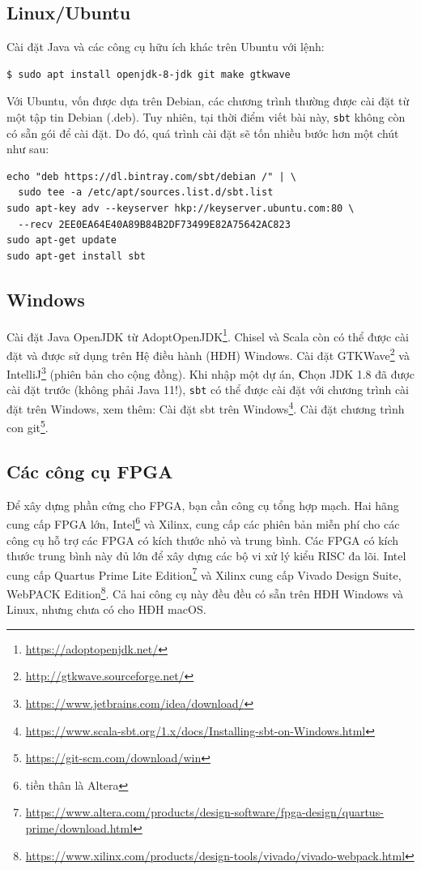 \documentclass[%
    10pt,
    headinclude, footexclude,
    openright, %
    notitlepage,
    cleardoubleempty,
    headsepline,
    pointlessnumbers,
    bibtotoc, idxtotoc,
    ]{scrbook}
\newcommand{\code}[1]{{\small{\texttt{#1}}}}
\newcommand{\myref}[2]{\href{#1}{#2}}
\renewcommand{\myref}[2]{{#2}{\footnote{\url{#1}}}}
\begin{document}
\subsection{Linux/Ubuntu}

Cài đặt Java và các công cụ hữu ích khác trên Ubuntu với lệnh:
\begin{verbatim}
$ sudo apt install openjdk-8-jdk git make gtkwave
\end{verbatim}

Với Ubuntu, vốn được dựa trên Debian, các chương trình thường được cài đặt từ một tập tin Debian (.deb). Tuy nhiên, tại thời điểm viết bài này, \code{sbt} không còn có sẵn gói để cài đặt. Do đó, quá trình cài đặt sẽ tốn nhiều bước hơn một chút như sau:
\begin{verbatim}
echo "deb https://dl.bintray.com/sbt/debian /" | \
  sudo tee -a /etc/apt/sources.list.d/sbt.list
sudo apt-key adv --keyserver hkp://keyserver.ubuntu.com:80 \
  --recv 2EE0EA64E40A89B84B2DF73499E82A75642AC823
sudo apt-get update
sudo apt-get install sbt
\end{verbatim}

\subsection{Windows}

Cài đặt Java OpenJDK từ \myref{https://adoptopenjdk.net/}{AdoptOpenJDK}.
Chisel và Scala còn có thể được cài đặt và được sử dụng trên Hệ điều hành (HĐH) Windows.
Cài đặt \myref{http://gtkwave.sourceforge.net/}{GTKWave} và
\myref{https://www.jetbrains.com/idea/download/}{IntelliJ} (phiên bản cho cộng đồng).
Khi nhập một dự án, {\textbf Chọn JDK 1.8} đã được cài đặt trước (không phải Java 11!),
\code{sbt} có thể được cài đặt với chương trình cài đặt trên Windows, xem thêm:
\myref{https://www.scala-sbt.org/1.x/docs/Installing-sbt-on-Windows.html}{Cài đặt sbt trên Windows}.
Cài đặt \myref{https://git-scm.com/download/win}{chương trình con git}.

\subsection{Các công cụ FPGA}

Để xây dựng phần cứng cho FPGA, bạn cần công cụ tổng hợp mạch. Hai hãng cung cấp FPGA lớn, Intel\footnote{tiền thân là Altera} và Xilinx, cung cấp các phiên bản miễn phí cho các công cụ hỗ trợ các FPGA có kích thước nhỏ và trung bình. Các FPGA có kích thước trung bình này đủ lớn để xây dựng các bộ vi xử lý kiểu RISC đa lõi. Intel cung cấp \myref{https://www.altera.com/products/design-software/fpga-design/quartus-prime/download.html}{Quartus Prime Lite Edition} và Xilinx cung cấp \myref{https://www.xilinx.com/products/design-tools/vivado/vivado-webpack.html}{Vivado Design Suite, WebPACK Edition}.
Cả hai công cụ này đều đều có sẵn trên HĐH Windows và Linux, nhưng chưa có cho HĐH macOS.
\end{document}
